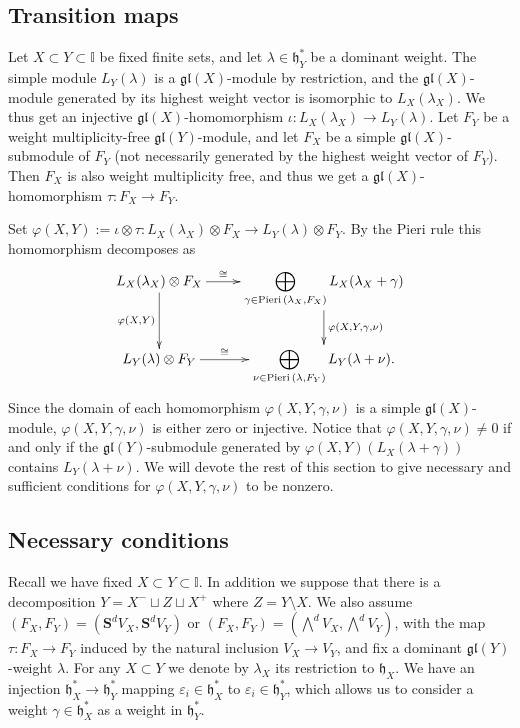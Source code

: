 \documentclass[11pt,fleqn]{amsart}
\newcommand\II{\mathbb I}
\renewcommand\to{\longrightarrow}
\renewcommand\phi{\varphi}
\renewcommand\epsilon{\varepsilon}
\theoremstyle{definition}
\theoremstyle{remark}
\theoremstyle{remark}
\newcommand\gl{\mathfrak{gl}}
\renewcommand\SS{\mathbf S}
\newcommand\lie[1]{\mathfrak{#1}}
\newcommand\Pieri[2]{\operatorname{Pieri}{(#1},{#2)}}
\newcommand\map[4]{\phi(#3,#4,#1,#2)}
\begin{document}
\subsection{Transition maps}
\label{ss:transition_maps}
Let $X \subset Y \subset \II$ be fixed finite sets, and let $\lambda \in \lie 
h_Y^*$ be a dominant weight. The simple module $L_Y(\lambda)$ is 
a $\gl(X)$-module by restriction, and the $\gl(X)$-module generated by its 
highest weight vector is isomorphic to $L_X(\lambda_X)$. We thus get an 
injective $\gl(X)$-homomorphism $\iota: L_X(\lambda_X) \to L_Y(\lambda)$. 
Let $F_Y$ be a weight multiplicity-free $\gl(Y)$-module, and let $F_X$ be a 
simple $\gl(X)$-submodule of $F_Y$ (not necessarily generated by the highest 
weight vector of $F_Y$). Then $F_X$ is also weight multiplicity free, and 
thus we get a $\gl(X)$-homomorphism $\tau: F_X \to F_Y$. 

Set $\phi(X,Y) := \iota \otimes \tau : L_X(\lambda_X) \otimes F_X \to 
L_Y(\lambda) \otimes F_Y$. By the Pieri rule this homomorphism decomposes as
\begin{align*}
  \xymatrix{
     L_X(\lambda_X) \otimes F_X \ar[r]^-{\cong}
      \ar[d]_-{\phi(X,Y)}
      & \displaystyle \bigoplus_{ \gamma \in \Pieri{\lambda_X}{F_X}} 
         L_X(\lambda_X +  \gamma) \ar[d]^-{\phi(X,Y,\gamma, \nu)} \\
     L_Y(\lambda) \otimes F_Y \ar[r]^-\cong
      & \displaystyle \bigoplus_{\nu \in \Pieri{\lambda}{F_Y}} 
         L_Y(\lambda +  \nu).
  }
\end{align*}
Since the domain of each homomorphism $\phi(X,Y,\gamma, \nu)$ is a simple 
$\gl(X)$-module, $\phi(X,Y,\gamma, \nu)$ is either zero or injective. Notice 
that $\phi(X,Y,\gamma, \nu) \neq 0$ if and only if the $\gl(Y)$-submodule 
generated by $\phi(X,Y)(L_X(\lambda + \gamma))$ contains $L_Y(\lambda + 
\nu)$. We will devote the rest of this section to give necessary and sufficient
conditions for $\map{\gamma}{\nu}{X}{Y}$ to be nonzero.

\subsection{Necessary conditions}
\label{ss:necessary_conditions}
Recall we have fixed $X \subset Y \subset \II$. In addition we suppose that 
there is a decomposition $Y = X^- \sqcup Z \sqcup X^+$ where $Z = Y \setminus 
X$. We also assume $(F_X, F_Y) = (\SS^dV_X, \SS^dV_Y)$ or $(F_X,F_Y) = 
(\bigwedge^d V_X, \bigwedge^d V_Y)$, with the map $\tau: F_X \to 
F_Y$ induced by the natural inclusion $V_X \to V_Y$, and fix a dominant 
$\gl(Y)$-weight $\lambda$. For any $X \subset Y$ we denote by $\lambda_X$ 
its restriction to $\lie h_X$. We have an injection $\lie h_X^* \to \lie h_Y^*$
mapping $\epsilon_i \in \lie h^*_X$ to $\epsilon_i \in \lie h_Y^*$, which 
allows us to consider a weight  $\gamma \in \lie h^*_X$ as a weight in $\lie 
h^*_Y$.
\end{document}
